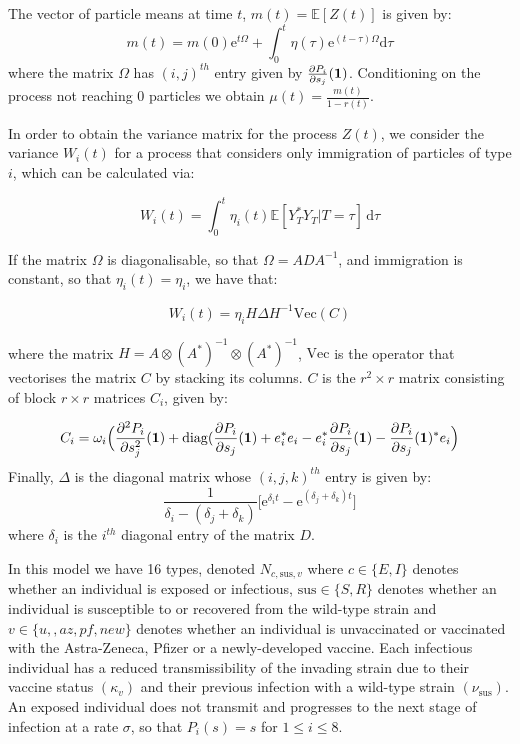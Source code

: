 \documentclass{article}
\begin{document}
The vector of particle means at time $t$, $m(t) = {\mathbb{E}}[Z(t)]$ is given by:
\begin{equation}
m(t) = m(0){\mathrm{e}}^{t\Omega} + \int_0^t \eta(\tau){\mathrm{e}}^{(t-\tau)\Omega} {\mathrm{d}}\tau 
\end{equation}
where the matrix $\Omega$ has $(i, j)^{th}$ entry given by $\frac{\partial P_i}{\partial s_j}({\vb{1}})$. Conditioning on the process not reaching $0$ particles we obtain $\mu (t) = \frac{m(t)}{1-r(t)}$. 

In order to obtain the variance matrix for the process $Z(t)$, we consider the variance $W_i(t)$ for a process that considers only immigration of particles of type $i$, which can be calculated via:

\begin{equation}
W_i(t) = \int_0^t \eta_i(t) {\mathbb{E}}[Y_T^*Y_T | T=\tau] \, {\mathrm{d}}\tau
\end{equation}

If the matrix $\Omega$ is diagonalisable, so that $\Omega = ADA^{-1}$, and immigration is constant, so that $\eta_i(t) = \eta_i$, we have that:

\begin{equation}
W_i(t) = \eta_i H\Delta H^{-1} {\mathrm{Vec}}(C)
\end{equation}
 
where the matrix $H= A \otimes (A^*)^{-1} \otimes (A^*)^{-1}$, ${\mathrm{Vec}}$ is the operator that vectorises the matrix $C$ by stacking its columns. $C$ is the $r^2 \times r$ matrix consisting of block $r \times r$ matrices $C_i$, given by:

\begin{equation}
C_i = \omega_i\Big(\frac{\partial^2 P_i}{\partial s_j^2}({\vb{1}}) + {\mathrm{diag}}(\frac{\partial P_i}{\partial s_j}({\vb{1}}) + e_i^*e_i - e_i^* \frac{\partial P_i}{\partial s_j}({\vb{1}}) - \frac{\partial P_i}{\partial s_j}({\vb{1}})^*e_i\Big)
\end{equation}
Finally, $\Delta$ is the diagonal matrix whose $(i, j, k)^{th}$ entry is given by:
\begin{equation}
\frac{1}{\delta_i - (\delta_j + \delta_k)}\big[{\mathrm{e}}^{\delta_i t} - {\mathrm{e}}^{(\delta_j + \delta_k) t}\big] 
\end{equation}
where $\delta_i$ is the $i^{th}$ diagonal entry of the matrix $D$. 

In this model we have 16 types, denoted $N_{c, {\mathrm{sus}}, v}$ where $c \in \{E, I\}$ denotes whether an individual is exposed or infectious, $ {\mathrm{sus}} \in \{S, R\}$ denotes whether an individual is susceptible to or recovered from the wild-type strain and $v \in \{u, , az, pf, new\}$ denotes whether an individual is unvaccinated or vaccinated with the Astra-Zeneca, Pfizer or a newly-developed vaccine. Each infectious individual has a reduced transmissibility of the invading strain due to their vaccine status $(\kappa_v)$ and their previous infection with a wild-type strain $(\nu_{\mathrm{sus}})$. An exposed individual does not transmit and progresses to the next stage of infection at a rate $\sigma$, so that $P_i(s) = s$ for $1 \leq i \leq 8$. 
\end{document}
